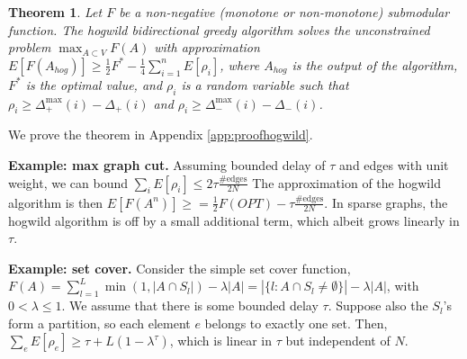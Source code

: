 \documentclass{article} %
\newtheorem{thm}{Theorem}[section]
\begin{document}
\begin{thm}\label{thm:randomapprox} Let $F$ be a non-negative (monotone or non-monotone) submodular function.
The hogwild bidirectional greedy algorithm solves the unconstrained problem $\max_{A\subset V} F(A)$ with approximation
$
E[F(A_{hog})] \geq \frac{1}{2}F^* - \frac{1}{4}\sum_{i=1}^n E[\rho_i]$,
where $A_{hog}$ is the output of the algorithm, $F^*$ is the optimal value, and $\rho_i$ is a random variable such that $\rho_i \geq \Delta_+^{\max}(i) - \Delta_+(i)$ and $\rho_i \geq \Delta_-^{\max}(i) - \Delta_-(i)$.
\end{thm}

We prove the theorem in Appendix \ref{app:proofhogwild}.



\textbf{Example: max graph cut.}
Assuming bounded delay of $\tau$ and edges with unit weight, we can bound $\sum_i E[\rho_i] \leq 2\tau\frac{\text{\#edges}}{2N}$
The approximation of the hogwild algorithm is then $E[F(A^n)] \geq = \frac{1}{2} F(OPT) - \tau\frac{\#\text{edges}}{2N}$.
In sparse graphs, the hogwild algorithm is off by a small additional term, which albeit grows linearly in $\tau$.



\textbf{Example: set cover.}
Consider the simple set cover function,
$F(A) = \sum_{l=1}^L \min(1,|A\cap S_l|) - \lambda|A| = |\{l: A\cap S_l \neq\emptyset\}| - \lambda|A|$,
with $0 < \lambda \leq 1$.
We assume that there is some bounded delay $\tau$.
Suppose also the $S_l$'s form a partition, so each element $e$ belongs to exactly one set.
Then, $\sum_e E[\rho_e] \geq \tau + L(1-\lambda^\tau)$, which is linear in $\tau$ but independent of $N$.
\end{document}
